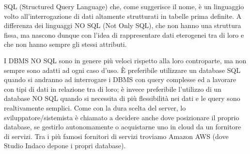 \documentclass[12pt,a4paper]{article}
\begin{document}
SQL (Structured Query Language) che, come suggerisce il nome, è un linguaggio volto all’interrogazione di dati altamente strutturati in tabelle prima definite.
A differenza dei linguaggi NO SQL (Not Only SQL), che non hanno una struttura fissa, ma nascono dunque con l’idea di rappresentare dati eterogenei tra di loro e che non hanno sempre gli stessi attributi.

I DBMS NO SQL sono in genere più veloci rispetto alla loro controparte, ma non sempre sono adatti ad ogni caso d’uso. È preferibile utilizzare un database SQL quando si andranno ad interrogare i DBMS con query complesse ed a lavorare con tipi di dati in relazione tra di loro; è invece preferibile l’utilizzo di un database NO SQL quando si necessita di più flessibilità nei dati e le query sono realtivamente semplici.
Come con la dura scelta del server, lo sviluppatore/sistemista è chiamato a decidere anche dove posizionare il proprio database, se gestirlo autonomamente o acquistarne uno in cloud da un fornitore di servizi. Tra i più famosi fornitori di servizi troviamo Amazon AWS (dove Studio Indaco depone i propri database).
\end{document}
